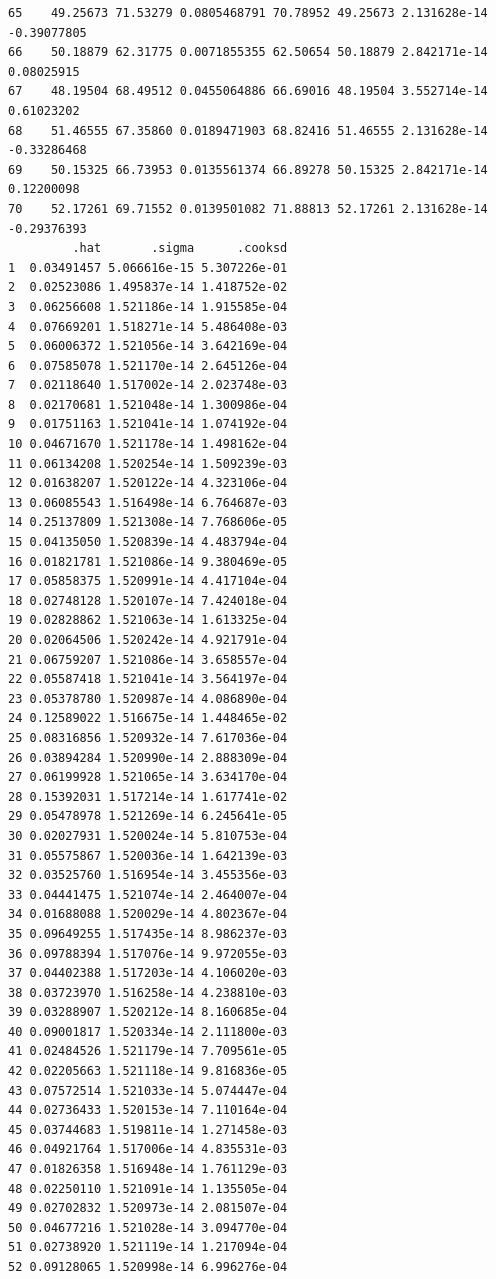 \documentclass[]{article}
\begin{document}
\begin{verbatim}
65    49.25673 71.53279 0.0805468791 70.78952 49.25673 2.131628e-14 -0.39077805
66    50.18879 62.31775 0.0071855355 62.50654 50.18879 2.842171e-14  0.08025915
67    48.19504 68.49512 0.0455064886 66.69016 48.19504 3.552714e-14  0.61023202
68    51.46555 67.35860 0.0189471903 68.82416 51.46555 2.131628e-14 -0.33286468
69    50.15325 66.73953 0.0135561374 66.89278 50.15325 2.842171e-14  0.12200098
70    52.17261 69.71552 0.0139501082 71.88813 52.17261 2.131628e-14 -0.29376393
         .hat       .sigma      .cooksd
1  0.03491457 5.066616e-15 5.307226e-01
2  0.02523086 1.495837e-14 1.418752e-02
3  0.06256608 1.521186e-14 1.915585e-04
4  0.07669201 1.518271e-14 5.486408e-03
5  0.06006372 1.521056e-14 3.642169e-04
6  0.07585078 1.521170e-14 2.645126e-04
7  0.02118640 1.517002e-14 2.023748e-03
8  0.02170681 1.521048e-14 1.300986e-04
9  0.01751163 1.521041e-14 1.074192e-04
10 0.04671670 1.521178e-14 1.498162e-04
11 0.06134208 1.520254e-14 1.509239e-03
12 0.01638207 1.520122e-14 4.323106e-04
13 0.06085543 1.516498e-14 6.764687e-03
14 0.25137809 1.521308e-14 7.768606e-05
15 0.04135050 1.520839e-14 4.483794e-04
16 0.01821781 1.521086e-14 9.380469e-05
17 0.05858375 1.520991e-14 4.417104e-04
18 0.02748128 1.520107e-14 7.424018e-04
19 0.02828862 1.521063e-14 1.613325e-04
20 0.02064506 1.520242e-14 4.921791e-04
21 0.06759207 1.521086e-14 3.658557e-04
22 0.05587418 1.521041e-14 3.564197e-04
23 0.05378780 1.520987e-14 4.086890e-04
24 0.12589022 1.516675e-14 1.448465e-02
25 0.08316856 1.520932e-14 7.617036e-04
26 0.03894284 1.520990e-14 2.888309e-04
27 0.06199928 1.521065e-14 3.634170e-04
28 0.15392031 1.517214e-14 1.617741e-02
29 0.05478978 1.521269e-14 6.245641e-05
30 0.02027931 1.520024e-14 5.810753e-04
31 0.05575867 1.520036e-14 1.642139e-03
32 0.03525760 1.516954e-14 3.455356e-03
33 0.04441475 1.521074e-14 2.464007e-04
34 0.01688088 1.520029e-14 4.802367e-04
35 0.09649255 1.517435e-14 8.986237e-03
36 0.09788394 1.517076e-14 9.972055e-03
37 0.04402388 1.517203e-14 4.106020e-03
38 0.03723970 1.516258e-14 4.238810e-03
39 0.03288907 1.520212e-14 8.160685e-04
40 0.09001817 1.520334e-14 2.111800e-03
41 0.02484526 1.521179e-14 7.709561e-05
42 0.02205663 1.521118e-14 9.816836e-05
43 0.07572514 1.521033e-14 5.074447e-04
44 0.02736433 1.520153e-14 7.110164e-04
45 0.03744683 1.519811e-14 1.271458e-03
46 0.04921764 1.517006e-14 4.835531e-03
47 0.01826358 1.516948e-14 1.761129e-03
48 0.02250110 1.521091e-14 1.135505e-04
49 0.02702832 1.520973e-14 2.081507e-04
50 0.04677216 1.521028e-14 3.094770e-04
51 0.02738920 1.521119e-14 1.217094e-04
52 0.09128065 1.520998e-14 6.996276e-04

\end{verbatim}
\end{document}
